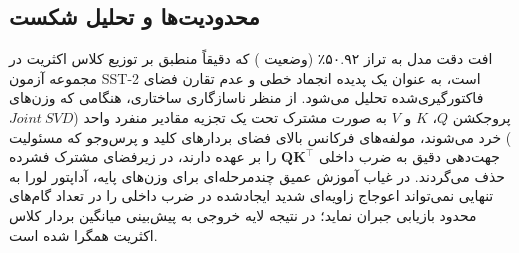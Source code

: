 \subsection{محدودیت‌ها و تحلیل شکست}
افت دقت مدل به تراز ۵۰.۹۲٪ (وضعیت ) که دقیقاً منطبق بر توزیع کلاس اکثریت در مجموعه آزمون SST-2 است، به عنوان یک پدیده انجماد خطی و عدم تقارن فضای فاکتورگیری‌شده تحلیل می‌شود. از منظر ناسازگاری ساختاری، هنگامی که وزن‌های پروجکشن $Q$، $K$ و $V$ به صورت مشترک تحت یک تجزیه مقادیر منفرد واحد ($Joint\ SVD$) خرد می‌شوند، مولفه‌های فرکانس بالای فضای بردارهای کلید و پرس‌وجو که مسئولیت جهت‌دهی دقیق به ضرب داخلی $\mathbf{Q}\mathbf{K}^\top$ را بر عهده دارند، در زیرفضای مشترک فشرده حذف می‌گردند. در غیاب آموزش عمیق چندمرحله‌ای برای وزن‌های پایه، آداپتور لورا به تنهایی نمی‌تواند اعوجاج زاویه‌ای شدید ایجادشده در ضرب داخلی را در تعداد گام‌های محدود بازیابی جبران نماید؛ در نتیجه لایه خروجی به پیش‌بینی میانگین بردار کلاس اکثریت همگرا شده است.
